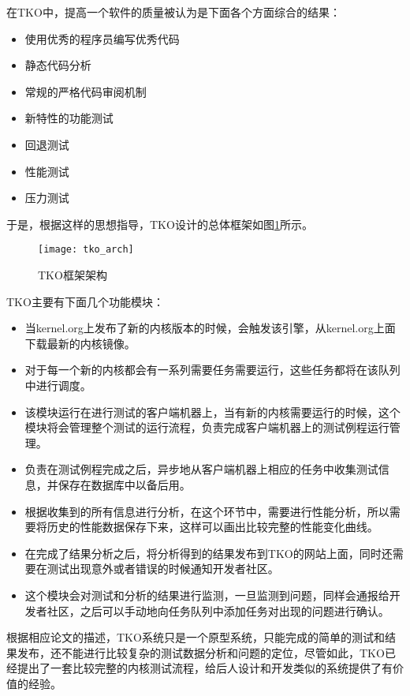 在TKO中，提高一个软件的质量被认为是下面各个方面综合的结果：
\begin{itemize}
\item 使用优秀的程序员编写优秀代码
\item 静态代码分析
\item 常规的严格代码审阅机制
\item 新特性的功能测试
\item 回退测试
\item 性能测试
\item 压力测试
\end{itemize}
于是，根据这样的思想指导，TKO设计的总体框架如图\ref{fig:tko_arch}所示。

\begin{figure}[H]
\centering
\texttt{[image: tko\_arch]}
\caption{TKO框架架构\cite{bligh2006fully}}
\label{fig:tko_arch}
\end{figure}

TKO主要有下面几个功能模块：
\begin{itemize}
\item[\heiti{镜像触发引擎:}] 当kernel.org上发布了新的内核版本的时候，会触发该引擎，从kernel.org上面下载最新的内核镜像。
\item[\heiti{服务器工作队列:}] 对于每一个新的内核都会有一系列需要任务需要运行，这些任务都将在该队列中进行调度。
\item[\heiti{客户端管理:}] 该模块运行在进行测试的客户端机器上，当有新的内核需要运行的时候，这个模块将会管理整个测试的运行流程，负责完成客户端机器上的测试例程运行管理。
\item[\heiti{结果收集:}] 负责在测试例程完成之后，异步地从客户端机器上相应的任务中收集测试信息，并保存在数据库中以备后用。
\item[\heiti{结果分析:}] 根据收集到的所有信息进行分析，在这个环节中，需要进行性能分析，所以需要将历史的性能数据保存下来，这样可以画出比较完整的性能变化曲线。
\item[\heiti{结果发布:}] 在完成了结果分析之后，将分析得到的结果发布到TKO的网站上面，同时还需要在测试出现意外或者错误的时候通知开发者社区。
\item[\heiti{问题监测:}] 这个模块会对测试和分析的结果进行监测，一旦监测到问题，同样会通报给开发者社区，之后可以手动地向任务队列中添加任务对出现的问题进行确认。
\end{itemize}

根据相应论文的描述，TKO系统只是一个原型系统，只能完成的简单的测试和结果发布，还不能进行比较复杂的测试数据分析和问题的定位，尽管如此，TKO已经提出了一套比较完整的内核测试流程，给后人设计和开发类似的系统提供了有价值的经验。


